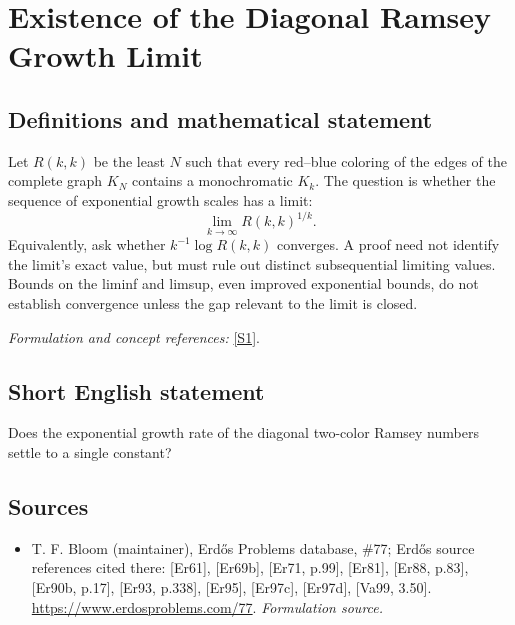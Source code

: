 \documentclass[11pt]{article}
\begin{document}
\section*{\texorpdfstring{Existence of the Diagonal Ramsey Growth Limit}{Existence of the Diagonal Ramsey Growth Limit}}\label{30005106}
\subsection{Definitions and mathematical statement}
Let $R(k,k)$ be the least $N$ such that every red--blue coloring of the edges of the complete graph $K_N$ contains a monochromatic $K_k$. The question is whether the sequence of exponential growth scales has a limit:
\[
 \lim_{k\to\infty}R(k,k)^{1/k}.
\]
Equivalently, ask whether $k^{-1}\log R(k,k)$ converges. A proof need not identify the limit's exact value, but must rule out distinct subsequential limiting values. Bounds on the liminf and limsup, even improved exponential bounds, do not establish convergence unless the gap relevant to the limit is closed.
\par\smallskip\textit{Formulation and concept references:} \href{https://www.erdosproblems.com/77}{[S1]}.

\subsection{Short English statement}
Does the exponential growth rate of the diagonal two-color Ramsey numbers settle to a single constant?
\subsection{Sources}
\begin{itemize}
\item[S1]T. F. Bloom (maintainer), Erdős Problems database, \#77; Erdős source references cited there: [Er61], [Er69b], [Er71, p.99], [Er81], [Er88, p.83], [Er90b, p.17], [Er93, p.338], [Er95], [Er97c], [Er97d], [Va99, 3.50].
\url{https://www.erdosproblems.com/77}.
\textit{Formulation source.}
\end{itemize}
\end{document}
